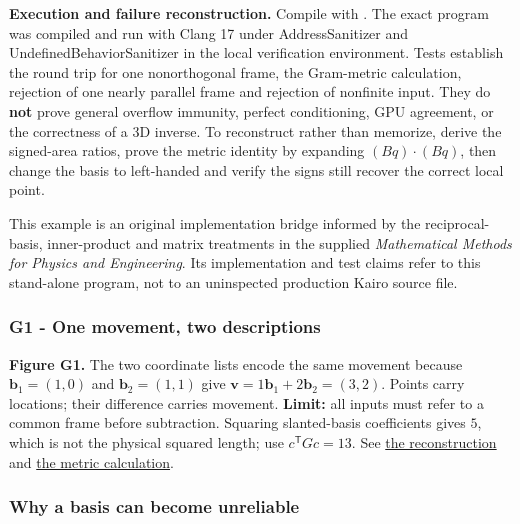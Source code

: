 \textbf{Execution and failure reconstruction.} Compile with . The exact program was compiled and run with Clang 17 under AddressSanitizer and UndefinedBehaviorSanitizer in the local verification environment. Tests establish the round trip for one nonorthogonal frame, the Gram-metric calculation, rejection of one nearly parallel frame and rejection of nonfinite input. They do \textbf{not} prove general overflow immunity, perfect conditioning, GPU agreement, or the correctness of a 3D inverse. To reconstruct rather than memorize, derive the signed-area ratios, prove the metric identity by expanding \((Bq)\cdot(Bq)\), then change the basis to left-handed and verify the signs still recover the correct local point.

This example is an original implementation bridge informed by the reciprocal-basis, inner-product and matrix treatments in the supplied \emph{Mathematical Methods for Physics and Engineering}. Its implementation and test claims refer to this stand-alone program, not to an uninspected production Kairo source file.

\subsubsection{G1 - One movement, two descriptions}\label{01-foundations-i-ch017-g1---one-movement-two-descriptions}

\hypertarget{01-foundations-i-ch017-g1---one-movement-two-descriptions}{}


\textbf{Figure G1.} The two coordinate lists encode the same movement because \(\mathbf b_1=(1,0)\) and \(\mathbf b_2=(1,1)\) give \(\mathbf v=1\mathbf b_1+2\mathbf b_2=(3,2)\). Points carry locations; their difference carries movement. \textbf{Limit:} all inputs must refer to a common frame before subtraction. Squaring slanted-basis coefficients gives \(5\), which is not the physical squared length; use \(c^\mathsf TGc=13\). See \hyperref[01-foundations-i-ch017-the-same-arrow-can-have-different-coordinates]{the reconstruction} and \hyperref[01-foundations-i-ch018-a-gram-matrix-remembers-the-geometry-of-a-slanted-basis]{the metric calculation}.

\subsubsection{Why a basis can become unreliable}\label{01-foundations-i-ch017-why-a-basis-can-become-unreliable}

